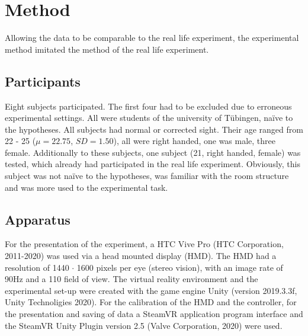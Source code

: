 


\chapter{Method}
\label{Method}
Allowing the data to be comparable to the real life experiment, the experimental method imitated  the method of the real life experiment. 

\section{Participants}
Eight subjects participated. The first four had to be excluded due to erroneous experimental settings. All were students of the university of Tübingen, na\"{i}ve to the hypotheses. All subjects had normal or corrected sight. Their age ranged from 22 - 25 ($\mu = 22.75$, $SD = 1.50$), all were right handed, one was male, three female. 
Additionally to these subjects, one subject (21, right handed, female) was tested, which already had participated in the real life experiment. Obviously, this subject was not na\"{i}ve to the hypotheses, was familiar with the room structure and was more used to the experimental task.

\section{Apparatus}
For the presentation of the experiment, a HTC Vive Pro (HTC Corporation, 2011-2020) was used via a head mounted display (HMD). The HMD had a re\-so\-lu\-tion  of 1440 $\cdot$ 1600 pixels per eye (stereo vision), with an image rate of 90Hz and a 110\textdegree{} field of view. The virtual reality environment and the experimental set-up were created with the game engine Unity (version 2019.3.3f, Unity Technoligies 2020). For the calibration of the HMD and the controller, for the presentation and saving of data a SteamVR application program interface and the SteamVR Unity Plugin version 2.5 (Valve Corporation, 2020) were used. 

